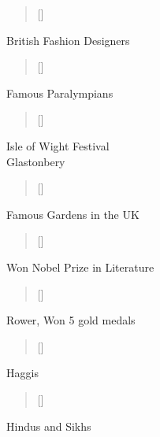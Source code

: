 \documentclass[grid,avery5371]{flashcards}
\begin{document}
\begin{flashcard}[]{%
\begin{verse}[\versewidth]
\end{verse}}

British Fashion Designers

\end{flashcard}

\begin{flashcard}[]{%
\begin{verse}[\versewidth]
\end{verse}}

Famous Paralympians

\end{flashcard}


\begin{flashcard}[]{%
\begin{verse}[\versewidth]
\end{verse}}

Isle of Wight Festival \\ Glastonbery

\end{flashcard}

\begin{flashcard}[]{%
\begin{verse}[\versewidth]
\end{verse}}

Famous Gardens in the UK

\end{flashcard}

\begin{flashcard}[]{%
\begin{verse}[\versewidth]
\end{verse}}

Won Nobel Prize in Literature

\end{flashcard}

\begin{flashcard}[]{%
\begin{verse}[\versewidth]
\end{verse}}

Rower, Won 5 gold medals 

\end{flashcard}

\begin{flashcard}[]{%
\begin{verse}[\versewidth]
\end{verse}}

Haggis 

\end{flashcard}

\begin{flashcard}[]{%
\begin{verse}[\versewidth]
\end{verse}}

Hindus and Sikhs 

\end{flashcard}
\end{document}
